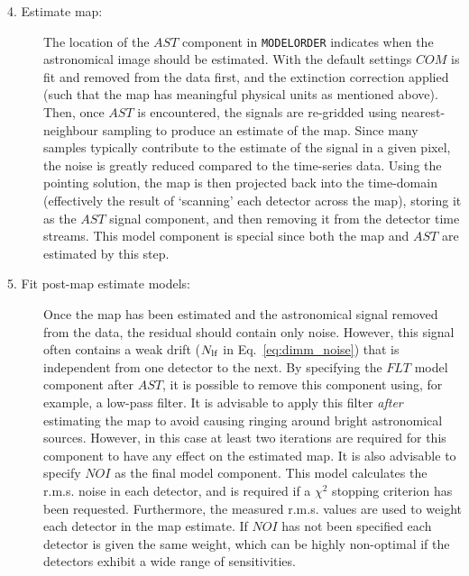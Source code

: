 \documentclass[twoside,11pt]{article}
\renewcommand{\_}{\texttt{\symbol{95}}}
\newcommand{\cparam}[1]{\texttt{#1}}     %
\begin{document}
\begin{description}
\item[4. Estimate map:] The location of the $AST$ component in
  \cparam{MODELORDER} indicates when the astronomical image should be
  estimated. With the default settings $COM$ is fit and removed from
  the data first, and the extinction correction applied (such that the
  map has meaningful physical units as mentioned above). Then, once
  $AST$ is encountered, the signals are re-gridded using
  nearest-neighbour sampling to produce an estimate of the map. Since
  many samples typically contribute to the estimate of the signal in a
  given pixel, the noise is greatly reduced compared to the
  time-series data. Using the pointing solution, the map is then
  projected back into the time-domain (effectively the result of
  `scanning' each detector across the map), storing it as the $AST$
  signal component, and then removing it from the detector time
  streams. This model component is special since both the map and
  $AST$ are estimated by this step.

\item[5. Fit post-map estimate models:] Once the map has been
  estimated and the astronomical signal removed from the data, the
  residual should contain only noise. However, this signal often
  contains a weak drift ($N_{\rm lf}$ in Eq.~\ref{eq:dimm_noise}) that
  is independent from one detector to the next. By specifying the
  $FLT$ model component after $AST$, it is possible to remove this
  component using, for example, a low-pass filter. It is advisable to
  apply this filter {\em after} estimating the map to avoid causing
  ringing around bright astronomical sources. However, in this case at
  least two iterations are required for this component to have any
  effect on the estimated map. It is also advisable to specify $NOI$
  as the final model component. This model calculates the r.m.s. noise
  in each detector, and is required if a $\chi^2$ stopping criterion
  has been requested. Furthermore, the measured r.m.s. values are used
  to weight each detector in the map estimate. If $NOI$ has not been
  specified each detector is given the same weight, which can be
  highly non-optimal if the detectors exhibit a wide range of
  sensitivities.


\end{description}
\end{document}
